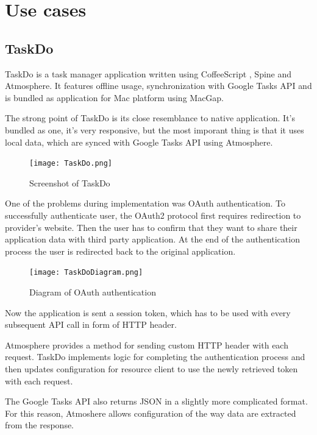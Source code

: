 \section{Use cases}

\subsection{TaskDo}

TaskDo \citep{taskdo} is a task manager application written using CoffeeScript \citep{coffeescript}, Spine \citep{spinejs} and Atmosphere. It features offline usage, synchronization with Google Tasks API \citep{google_tasks} and is bundled as application for Mac platform using MacGap. \citep{macgap}

The strong point of TaskDo is its close resemblance to native application. It's bundled as one, it's very responsive, but the most imporant thing is that it uses local data, which are synced with Google Tasks API using Atmosphere.

\begin{figure}[htbp]
  \centering
    \texttt{[image: TaskDo.png]}
  \caption{Screenshot of TaskDo}
  \label{fig:taskdo}
\end{figure}

One of the problems during implementation was OAuth authentication. To successfully authenticate user, the OAuth2 protocol \citep{oauth} first requires redirection to provider's website. Then the user has to confirm that they want to share their application data with third party application. At the end of the authentication process the user is redirected back to the original application.

\begin{figure}[ht!]
  \centering
    \texttt{[image: TaskDoDiagram.png]}
  \caption{Diagram of OAuth authentication}
  \label{fig:taskdo_diagram}
\end{figure}

Now the application is sent a session token, which has to be used with every subsequent API call in form of HTTP header.

Atmosphere provides a method for sending custom HTTP header with each request. TaskDo implements logic for completing the authentication process and then updates configuration for resource client to use the newly retrieved token with each request.

The Google Tasks API also returns JSON in a slightly more complicated format. For this reason, Atmoshere allows configuration of the way data are extracted from the response.

